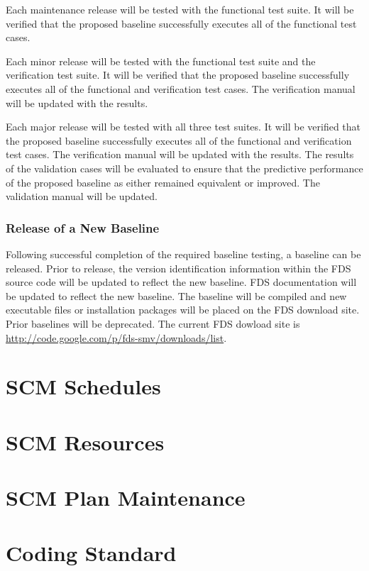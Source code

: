 \documentclass[11pt]{book}
\begin{document}
Each maintenance release will be tested with the functional test suite.  It will be verified that the proposed baseline
successfully executes all of the functional test cases.  

Each minor release will be tested with the functional test suite and the verification test suite.  It will be verified
that the proposed baseline successfully executes all of the functional and verification test cases.  The
verification manual will be updated with the results.

Each major release will be tested with all three test suites.    It will be verified
that the proposed baseline successfully executes all of the functional and verification test cases.  The verification
manual will be updated with the results.  The results of the validation cases will be evaluated to ensure that the
predictive performance of the proposed baseline as either remained equivalent or improved.  The validation manual will
be updated.

\subsection{Release of a New Baseline}

Following successful completion of the required baseline testing, a baseline can be released.  Prior to release, the 
version identification information within the FDS source code will be updated to reflect the new baseline.  FDS
documentation will be updated to reflect the new baseline.  The baseline will be compiled and new executable files 
or installation packages will be placed on the FDS download site.  Prior baselines will be deprecated.  The
current FDS dowload site is \href{http://code.google.com/p/fds-smv/downloads/list}
{{\ct http://code.google.com/p/fds-smv/downloads/list}}.

\chapter{SCM Schedules}
\chapter{SCM Resources}
\chapter{SCM Plan Maintenance}

\appendix

\chapter{Coding Standard}
\end{document}
